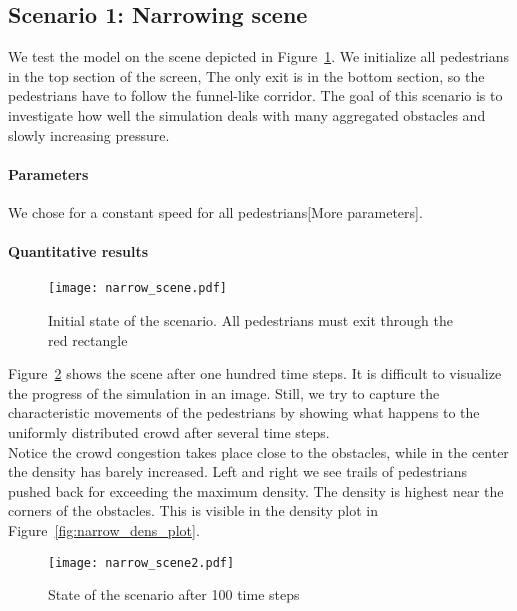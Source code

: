 \documentclass{article}
\begin{document}
\subsection{Scenario 1: Narrowing scene}
We test the model on the scene depicted in Figure~\ref{fig:narrowing_scene}. We initialize all pedestrians in the top section of the screen, The only exit is in the bottom section, so the pedestrians have to follow the funnel-like corridor.
The goal of this scenario is to investigate how well the simulation deals with many aggregated obstacles and slowly increasing pressure.\\
\paragraph{Parameters}
We chose for a constant speed for all pedestrians[More parameters].
\paragraph{Quantitative results}
\begin{figure}[h]
	\centering
	\texttt{[image: narrow\_scene.pdf]}
	\caption{Initial state of the scenario. All pedestrians must exit through the red rectangle}
	\label{fig:narrowing_scene}
\end{figure}
Figure~\ref{fig:narrow_scene2} shows the scene after one hundred time steps. It is difficult to visualize the progress of the simulation in an image. Still, we try to capture the characteristic movements of the pedestrians by showing what happens to the uniformly distributed crowd after several time steps.\\
Notice the crowd congestion takes place close to the obstacles, while in the center the density has barely increased. Left and right we see trails of pedestrians pushed back for exceeding the maximum density. The density is highest near the corners of the obstacles. This is visible in the density plot in Figure~\ref{fig:narrow_dens_plot}.
\begin{figure}[h]
	\centering
	\texttt{[image: narrow\_scene2.pdf]}
	\caption{State of the scenario after 100 time steps}
	\label{fig:narrow_scene2}
\end{figure}
\end{document}
